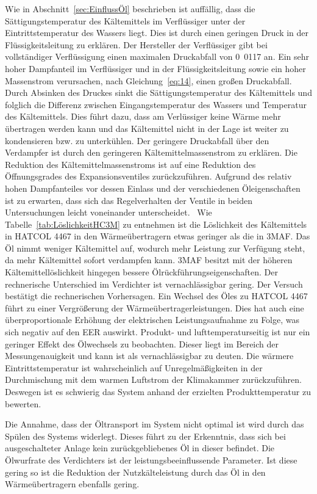 Wie in Abschnitt~\ref{sec:EinflussÖl} beschrieben ist auffällig, dass die Sättigungstemperatur des Kältemittels im Verflüssiger unter der Eintrittstemperatur des Wassers liegt. Dies ist durch einen geringen Druck in der Flüssigkeitsleitung zu erklären. Der Hersteller der Verflüssiger gibt bei vollständiger Verflüssigung einen maximalen Druckabfall von \unit{0.0117}{\bbar} an. Ein sehr hoher Dampfanteil im Verflüssiger und in der Flüssigkeitsleitung sowie ein hoher Massenstrom verursachen, nach Gleichung~\ref{eq:14}, einen großen Druckabfall. Durch Absinken des Druckes sinkt die Sättigungstemperatur des Kältemittels und folglich die Differenz zwischen Eingangstemperatur des Wassers und Temperatur des Kältemittels. Dies führt dazu, dass am Verlüssiger keine Wärme mehr übertragen werden kann und das Kältemittel nicht in der Lage ist weiter zu kondensieren bzw. zu unterkühlen. Der geringere Druckabfall über den Verdampfer ist durch den geringeren Kältemittelmassenstrom zu erklären. Die Reduktion des Kältemittelmassenstroms ist auf eine Reduktion des Öffnungsgrades des Expansionsventiles zurückzuführen. Aufgrund des relativ hohen Dampfanteiles vor dessen Einlass und der verschiedenen Öleigenschaften ist zu erwarten, dass sich das Regelverhalten der Ventile in beiden Untersuchungen leicht voneinander unterscheidet.  \
Wie Tabelle~\ref{tab:LöslichkeitHC3M} zu entnehmen ist die Löslichkeit des Kältemittels in HATCOL 4467 in den Wärmeübertragern etwas geringer als die in 3MAF. Das Öl nimmt weniger Kältemittel auf, wodurch mehr Leistung zur Verfügung steht, da mehr Kältemittel sofort verdampfen kann. 3MAF besitzt mit der höheren Kältemittellöslichkeit hingegen bessere Ölrückführungseigenschaften. Der rechnerische Unterschied im Verdichter ist vernachlässigbar gering.
Der Versuch bestätigt die rechnerischen Vorhersagen. Ein Wechsel des Öles zu HATCOL 4467 führt zu einer Vergrößerung der Wärmeübertragerleistungen. Dies hat auch eine überproportionale Erhöhung der elektrischen Leistungsaufnahme zu Folge, was sich negativ auf den EER auswirkt.
Produkt- und lufttemperaturseitig ist nur ein geringer Effekt des Ölwechsels zu beobachten. Dieser liegt im Bereich der Messungenauigkeit und kann ist als vernachlässigbar zu deuten. Die wärmere Eintrittstemperatur ist wahrscheinlich auf Unregelmäßigkeiten in der Durchmischung mit dem warmen Luftstrom der Klimakammer zurückzuführen. Deswegen ist es schwierig das System anhand der erzielten Produkttemperatur zu bewerten.

Die Annahme, dass der Öltransport im System nicht optimal ist wird durch das Spülen des Systems widerlegt. Dieses führt zu der Erkenntnis, dass sich bei ausgeschalteter Anlage kein zurückgebliebenes Öl in dieser befindet. Die Ölwurfrate des Verdichters ist der leistungsbeeinflussende Parameter. Ist diese gering so ist die Reduktion der Nutzkälteleistung durch das Öl in den Wärmeübertragern ebenfalls gering. 

